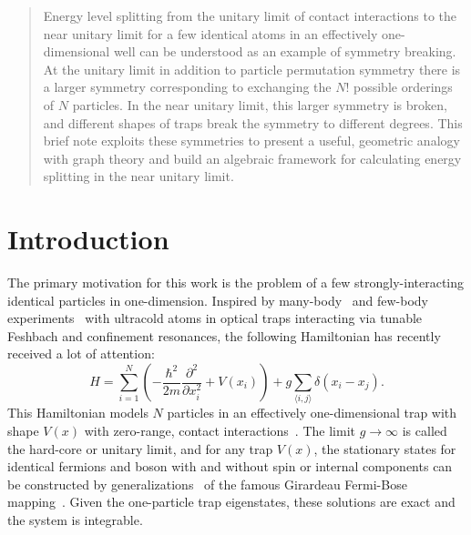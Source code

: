 \date{Received: date / Accepted: date}

\maketitle

\begin{abstract}
Energy level splitting from the unitary limit of contact interactions to the near unitary limit for a few identical atoms in an effectively one-dimensional well can be understood as an example of symmetry breaking. At the unitary limit in addition to particle permutation symmetry there is a larger symmetry corresponding to exchanging the $N!$ possible orderings of $N$ particles. In the near unitary limit, this larger symmetry is broken, and different shapes of traps break the symmetry to different degrees. This brief note exploits these symmetries to present a useful, geometric analogy with graph theory and build an algebraic framework for calculating energy splitting in the near unitary limit.
\end{abstract}

\section{Introduction}

The primary motivation for this work is the problem of a few strongly-interacting identical particles in one-dimension. Inspired by many-body~\cite{kinoshita_2004, paredes_2004, kinoshita_2006, haller_2009} and few-body experiments~\cite{serwane_deterministic_2011, wenz_few_2013, murmann_two_2015, murmann_antiferromagnetic_2015} with ultracold atoms in optical traps interacting via tunable Feshbach and confinement resonances, the following Hamiltonian has recently received a lot of attention:
\begin{equation}\label{eq:ham0}
H = \sum_{i=1}^N \left( - \frac{\hbar^2}{2 m} \frac{\partial^2}{\partial x_i^2} + V(x_i) \right) + g \sum_{\langle i,j \rangle}  \delta(x_i - x_j).
\end{equation}
This Hamiltonian models $N$ particles in an effectively one-dimensional trap with shape $V(x)$ with zero-range, contact interactions~\cite{olshanii_1998}. The limit $g\to\infty$ is called the hard-core or unitary limit, and for any trap $V(x)$, the stationary states for identical fermions and boson with and without spin or internal components can be constructed by generalizations~\cite{Girardeau2007, Deuretzbacher2008, Yang2009, Guan2009, Ma2009,  Girardeau2010a, Girardeau2010b, Girardeau2011, Fang2011, Cui2014, Harshman2016b} of the famous Girardeau Fermi-Bose mapping~\cite{Girardeau1960}. Given the one-particle trap eigenstates, these solutions are exact and the system is integrable. 

